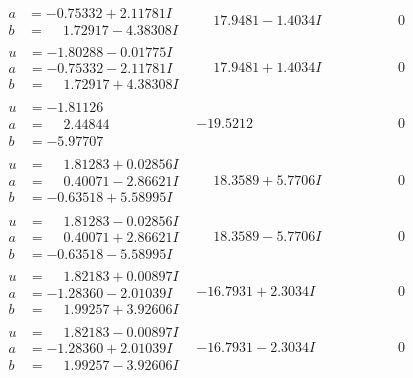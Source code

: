 \documentclass[1p]{elsarticle_modified}
\theoremstyle{definition}
\begin{document}
$$\begin{array}{c|c|c}
\begin{aligned}
a &= -0.75332 + 2.11781 I \\
b &= \phantom{-}1.72917 - 4.38308 I\end{aligned}
 & \phantom{-}17.9481 - 1.4034 I & \phantom{-0.000000 } 0 \\ \hline\begin{aligned}
u &= -1.80288 - 0.01775 I \\
a &= -0.75332 - 2.11781 I \\
b &= \phantom{-}1.72917 + 4.38308 I\end{aligned}
 & \phantom{-}17.9481 + 1.4034 I & \phantom{-0.000000 } 0 \\ \hline\begin{aligned}
u &= -1.81126\phantom{ +0.000000I} \\
a &= \phantom{-}2.44844\phantom{ +0.000000I} \\
b &= -5.97707\phantom{ +0.000000I}\end{aligned}
 & -19.5212\phantom{ +0.000000I} & \phantom{-0.000000 } 0 \\ \hline\begin{aligned}
u &= \phantom{-}1.81283 + 0.02856 I \\
a &= \phantom{-}0.40071 - 2.86621 I \\
b &= -0.63518 + 5.58995 I\end{aligned}
 & \phantom{-}18.3589 + 5.7706 I & \phantom{-0.000000 } 0 \\ \hline\begin{aligned}
u &= \phantom{-}1.81283 - 0.02856 I \\
a &= \phantom{-}0.40071 + 2.86621 I \\
b &= -0.63518 - 5.58995 I\end{aligned}
 & \phantom{-}18.3589 - 5.7706 I & \phantom{-0.000000 } 0 \\ \hline\begin{aligned}
u &= \phantom{-}1.82183 + 0.00897 I \\
a &= -1.28360 - 2.01039 I \\
b &= \phantom{-}1.99257 + 3.92606 I\end{aligned}
 & -16.7931 + 2.3034 I & \phantom{-0.000000 } 0 \\ \hline\begin{aligned}
u &= \phantom{-}1.82183 - 0.00897 I \\
a &= -1.28360 + 2.01039 I \\
b &= \phantom{-}1.99257 - 3.92606 I\end{aligned}
 & -16.7931 - 2.3034 I & \phantom{-0.000000 } 0 \\ \hline\begin{aligned}

\end{aligned}
\end{array}$$
\end{document}
